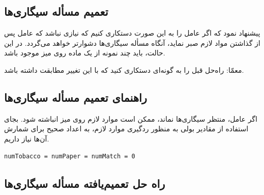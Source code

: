 \documentclass{book}
\newcommand{\clearemptydoublepage}{\newpage\cleardoublepage}
\begin{document}
\subsection{تعمیم مسأله سیگاری‌ها}

     پیشنهاد نمود که اگر عامل را به این صورت دستکاری کنیم 
    که نیازی نباشد که عامل پس از گذاشتن مواد لازم صبر نماید، آنگاه مسأله سیگاری‌ها دشوارتر خواهد می‌گردد. 
    در این حالت، باید چند نمونه از یک ماده روی میز موجود باشد. 

    معمّا: راه‌حل قبل را به گونه‌ای دستکاری کنید که با این تغییر مطابقت داشته باشد. 

\clearemptydoublepage
\subsection{راهنمای تعمیم مسأله سیگاری‌ها}

    اگر عامل، منتظر سیگاری‌ها نماند، ممکن است موارد لازم روی میز انباشته شود. بجای استفاده از مقادیر بولی به منظور ردگیری موارد لازم، 
    به اعداد صحیح برای شمارش آن‌ها نیاز داریم. 

\begin{latin}
\begin{lstlisting}[title=\rl{راهنمای تعمیم مسأله سیگاری‌ها}]
numTobacco = numPaper = numMatch = 0
\end{lstlisting}
\end{latin}


\clearemptydoublepage
\subsection{راه حل تعمیم‌یافته مسأله سیگاری‌ها}
\label{smoker}
\end{document}
